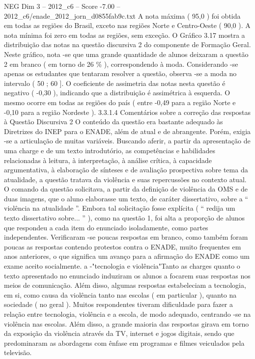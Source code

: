 \begin{textsample}{NEG Dim 3 – 2012\_c6 – Score -7.00 – 2012\_c6/enade\_2012\_jorn\_d0855fab9c.txt}
A nota máxima ( 95,0 ) foi obtida em todas as regiões do Brasil, exceto nas regiões Norte e Centro-Oeste ( 90,0 ).
A nota mínima foi zero em todas as regiões, sem exceção.
O Gráfico 3.17 mostra a distribuição das notas na questão discursiva 2 do componente de Formação Geral.
Neste gráfico, nota -se que uma grande quantidade de alunos deixaram a questão 2 em branco ( em torno de 26 \% ), correspondendo à moda.
Considerando -se apenas os estudantes que tentaram resolver a questão, observa -se a moda no intervalo ( 50 ; 60 ].
O coeficiente de assimetria das notas nesta questão é negativo ( -0,30 ), indicando que a distribuição é assimétrica à esquerda.
O mesmo ocorre em todas as regiões do país ( entre -0,49 para a região Norte e -0,10 para a região Nordeste ). 3.3.1.4 Comentários sobre a correção das respostas à Questão Discursiva 2 O conteúdo da questão era bastante adequado às Diretrizes do INEP para o ENADE, além de atual e de abrangente.
Porém, exigia -se a articulação de muitas variáveis.
Buscando aferir, a partir da apresentação de uma charge e de um texto introdutório, as competências e habilidades relacionadas à leitura, à interpretação, à análise crítica, à capacidade argumentativa, à elaboração de sínteses e de avaliação prospectiva sobre tema da atualidade, a questão tratava da violência e suas repercussões no contexto atual.
O comando da questão solicitava, a partir da definição de violência da OMS e de duas imagens, que o aluno elaborasse um texto, de caráter dissertativo, sobre a “ violência na atualidade ”.
Embora tal solicitação fosse explícita ( “ redija um texto dissertativo sobre... ” ), como na questão 1, foi alta a proporção de alunos que respondeu a cada item do enunciado isoladamente, como partes independentes.
Verificaram -se poucas respostas em branco, como também foram poucas as respostas contendo protestos contra o ENADE, muito frequentes em anos anteriores, o que significa um avanço para a afirmação do ENADE como um exame aceito socialmente. a -"tecnologia e violência"Tanto as charges quanto o texto apresentado no enunciado induziram os alunos a focarem suas respostas nos meios de comunicação.
Além disso, algumas respostas estabeleciam a tecnologia, em si, como causa da violência tanto nas escolas ( em particular ), quanto na sociedade ( no geral ).
Muitos respondentes tiveram dificuldade para fazer a relação entre tecnologia, violência e a escola, de modo adequado, centrando -se na violência nas escolas.
Além disso, a grande maioria das respostas girava em torno da exposição da violência através da TV, internet e jogos digitais, sendo que predominaram as abordagens com ênfase em programas e filmes veiculados pela televisão.

\end{textsample}
